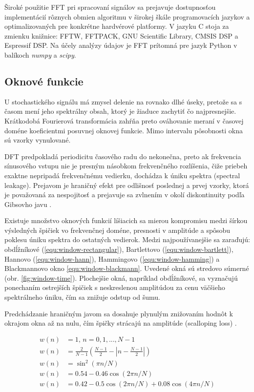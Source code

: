 Široké použitie FFT pri spracovaní signálov sa prejavuje dostupnosťou implementácií rôznych obmien algoritmu
v širokej škále programovacích jazykov a optimalizovaných pre konkrétne hardvérové platformy. V jazyku C stoja
za zmienku knižnice: FFTW, FFTPACK, GNU Scientific Library, CMSIS DSP a Espressif DSP. Na účely analýzy údajov je FFT
prítomná pre jazyk Python v balíkoch \emph{numpy} a \emph{scipy}.

\subsection{Oknové funkcie}
U stochastického signálu má zmysel delenie na rovnako dlhé úseky, pretože sa s časom mení jeho spektrálny obsah, ktorý
je žiaduce zachytiť čo najpresnejšie. Krátkodobá Fourierová transformácia zahŕňa preto ováhovanie meraní
v časovej doméne koeficientmi posuvnej oknovej funkcie. Mimo intervalu pôsobnosti okna sú vzorky vynulované.

DFT predpokladá periodicitu časového radu do nekonečna, preto ak frekvencia sínusového vstupu nie je presným násobkom
frekvenčného rozlíšenia, čiže priebeh exaktne nepripadá frekvenčnému vedierku, dochádza k úniku spektra (spectral leakage).
Prejavom je hraničný efekt pre odlišnosť poslednej a prvej vzorky, ktorá je považovaná za nespojitosť a prejavuje
sa zvlnením v okolí diskontinuity podľa Gibsovho javu \cite{understanding-dsp}.

Existuje množstvo oknových funkcií líšiacich sa mierou kompromisu medzi šírkou výsledných špičiek vo frekvenčnej doméne,
presnosti v amplitúde a spôsobu poklesu úniku spektra do ostatných vedierok. Medzi najpoužívanejšie sa zaraďujú: obdĺžníkové
(\ref{equ:window-rectangular}), Bartlettovo (\ref{equ:window-bartlett}), Hannovo (\ref{equ:window-hann}), Hammingovo
(\ref{equ:window-hamming}) a Blackmannovo okno \ref{equ:window-blackmann}. Uvedené okná sú stredovo súmerné 
(obr. \ref{fig:window-time}). Plochejšie okná, napríklad obdĺžníkové, sa vyznačujú ponechaním ostrejších špičiek 
s neskreslenou amplitúdou za cenu väčšieho spektrálneho úniku, čím sa znižuje odstup od šumu. 

Predchádzanie hraničným javom sa dosahuje plynulým
znižovaním hodnôt k okrajom okna až na nulu, čím špičky strácajú na amplitúde (scalloping loss) \cite{spectral-density-estimation}.
\begin{ceqn}\begin{align}
w(n) &= 1,\, n = 0, 1, ..., N - 1 \label{equ:window-rectangular} \\
w(n) &= \frac{2}{N - 1}\left(\frac{N - 1}{2} - \left|n - \frac{N - 1}{2} \right|\right) \label{equ:window-bartlett}  \\
w(n) &= \sin^2(\pi n / N)  \label{equ:window-hann} \\
w(n) &= 0.54 - 0.46\cos(2\pi n / N) \label{equ:window-hamming} \\
w(n) &= 0.42 - 0.5\cos(2\pi n / N) + 0.08\cos(4\pi n / N)\label{equ:window-blackmann}
\end{align}\end{ceqn}


